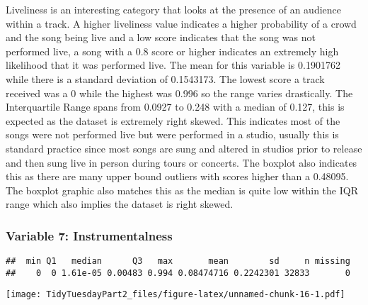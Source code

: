 \documentclass[
]{article}
\newenvironment{Shaded}{\begin{snugshade}}{\end{snugshade}}
\newcommand{\KeywordTok}[1]{\textcolor[rgb]{0.13,0.29,0.53}{\textbf{#1}}}
\newcommand{\NormalTok}[1]{#1}
\newcommand{\OperatorTok}[1]{\textcolor[rgb]{0.81,0.36,0.00}{\textbf{#1}}}
\newcommand{\StringTok}[1]{\textcolor[rgb]{0.31,0.60,0.02}{#1}}
\begin{document}
Liveliness is an interesting category that looks at the presence of an
audience within a track. A higher liveliness value indicates a higher
probability of a crowd and the song being live and a low score indicates
that the song was not performed live, a song with a 0.8 score or higher
indicates an extremely high likelihood that it was performed live. The
mean for this variable is 0.1901762 while there is a standard deviation
of 0.1543173. The lowest score a track received was a 0 while the
highest was 0.996 so the range varies drastically. The Interquartile
Range spans from 0.0927 to 0.248 with a median of 0.127, this is
expected as the dataset is extremely right skewed. This indicates most
of the songs were not performed live but were performed in a studio,
usually this is standard practice since most songs are sung and altered
in studios prior to release and then sung live in person during tours or
concerts. The boxplot also indicates this as there are many upper bound
outliers with scores higher than a 0.48095. The boxplot graphic also
matches this as the median is quite low within the IQR range which also
implies the dataset is right skewed.

\hypertarget{variable-7-instrumentalness}{%
\subsubsection{Variable 7:
Instrumentalness}\label{variable-7-instrumentalness}}

\begin{Shaded}
\end{Shaded}

\begin{verbatim}
##  min Q1   median      Q3   max       mean        sd     n missing
##    0  0 1.61e-05 0.00483 0.994 0.08474716 0.2242301 32833       0
\end{verbatim}

\texttt{[image: TidyTuesdayPart2\_files/figure-latex/unnamed-chunk-16-1.pdf]}
\end{document}
